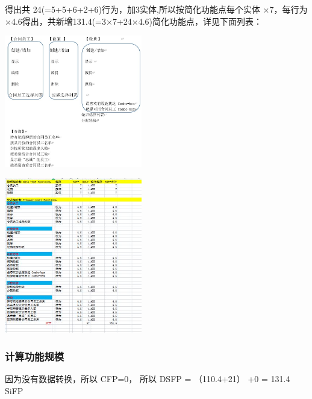 得出共 24(=5+5+6+2+6)行为，加3实体,所以按简化功能点每个实体 ×7，每行为
×4.6得出，共新增131.4(=3×7+24×4.6)简化功能点，详见下面列表：


\includegraphics[width=6cm]{Ex1SoluScreenshot_2022-04-05_115926.jpg}


\includegraphics[width=6cm]{微信截图_20220412130822.jpg}

\hypertarget{ux8ba1ux7b97ux529fux80fdux89c4ux6a21}{%
\subsubsection{计算功能规模}\label{ux8ba1ux7b97ux529fux80fdux89c4ux6a21}}

\begin{description}
\item[]
\end{description}

因为没有数据转换，所以 CFP=0， 所以 DSFP = （110.4+21） +0 = 131.4 SiFP


